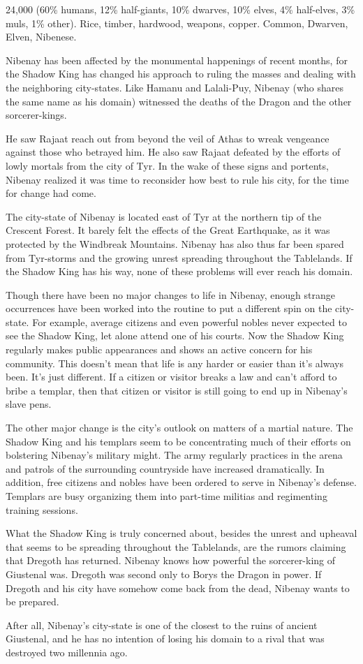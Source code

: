 {24,000 (60\% humans, 12\% half-giants, 10\% dwarves, 10\% elves, 4\% half-elves, 3\% muls, 1\% other).}
{Rice, timber, hardwood, weapons, copper.}
{Common, Dwarven, Elven, Nibenese.}
{
	Nibenay has been affected by the monumental happenings of recent months, for the Shadow King has changed his approach to ruling the masses and dealing with the neighboring city-states. Like Hamanu and Lalali-Puy, Nibenay (who shares the same name as his domain) witnessed the deaths of the Dragon and the other sorcerer-kings.

	He saw Rajaat reach out from beyond the veil of Athas to wreak vengeance against those who betrayed him. He also saw Rajaat defeated by the efforts of lowly mortals from the city of Tyr. In the wake of these signs and portents, Nibenay realized it was time to reconsider how best to rule his city, for the time for change had come.

	The city-state of Nibenay is located east of Tyr at the northern tip of the Crescent Forest. It barely felt the effects of the Great Earthquake, as it was protected by the Windbreak Mountains. Nibenay has also thus far been spared from Tyr-storms and the growing unrest spreading throughout the Tablelands. If the Shadow King has his way, none of these problems will ever reach his domain.
}
{

	Though there have been no major changes to life in Nibenay, enough strange occurrences have been worked into the routine to put a different spin on the city-state. For example, average citizens and even powerful nobles never expected to see the Shadow King, let alone attend one of his courts. Now the Shadow King regularly makes public appearances and shows an active concern for his community. This doesn't mean that life is any harder or easier than it's always been. It's just different. If a citizen or visitor breaks a law and can't afford to bribe a templar, then that citizen or visitor is still going to end up in Nibenay's slave pens.

	The other major change is the city's outlook on matters of a martial nature. The Shadow King and his templars seem to be concentrating much of their efforts on bolstering Nibenay's military might. The army regularly practices in the arena and patrols of the surrounding countryside have increased dramatically. In addition, free citizens and nobles have been ordered to serve in Nibenay's defense. Templars are busy organizing them into part-time militias and regimenting training sessions.

	What the Shadow King is truly concerned about, besides the unrest and upheaval that seems to be spreading throughout the Tablelands, are the rumors claiming that Dregoth has returned. Nibenay knows how powerful the sorcerer-king of Giustenal was. Dregoth was second only to Borys the Dragon in power. If Dregoth and his city have somehow come back from the dead, Nibenay wants to be prepared.

	After all, Nibenay's city-state is one of the closest to the ruins of ancient Giustenal, and he has no intention of losing his domain to a rival that was destroyed two millennia ago.
}
